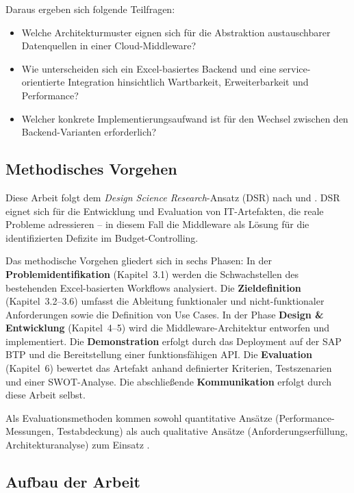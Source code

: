 Daraus ergeben sich folgende Teilfragen:

\begin{itemize}
    \item[\textbf{TF-1}] Welche Architekturmuster eignen sich für die Abstraktion austauschbarer Datenquellen in einer Cloud-Middleware?
    \item[\textbf{TF-2}] Wie unterscheiden sich ein Excel-basiertes Backend und eine service-orientierte Integration hinsichtlich Wartbarkeit, Erweiterbarkeit und Performance?
    \item[\textbf{TF-3}] Welcher konkrete Implementierungsaufwand ist für den Wechsel zwischen den Backend-Varianten erforderlich?
\end{itemize}

\subsection{Methodisches Vorgehen}

Diese Arbeit folgt dem \textit{Design Science Research}-Ansatz (DSR) nach \cite{hevner2004} und \cite{peffers2007}. DSR eignet sich für die Entwicklung und Evaluation von IT-Artefakten, die reale Probleme adressieren -- in diesem Fall die Middleware als Lösung für die identifizierten Defizite im Budget-Controlling.

Das methodische Vorgehen gliedert sich in sechs Phasen: In der \textbf{Problemidentifikation} (Kapitel~3.1) werden die Schwachstellen des bestehenden Excel-basierten Workflows analysiert. Die \textbf{Zieldefinition} (Kapitel~3.2--3.6) umfasst die Ableitung funktionaler und nicht-funktionaler Anforderungen sowie die Definition von Use Cases. In der Phase \textbf{Design \& Entwicklung} (Kapitel~4--5) wird die Middleware-Architektur entworfen und implementiert. Die \textbf{Demonstration} erfolgt durch das Deployment auf der SAP BTP und die Bereitstellung einer funktionsfähigen API. Die \textbf{Evaluation} (Kapitel~6) bewertet das Artefakt anhand definierter Kriterien, Testszenarien und einer SWOT-Analyse. Die abschließende \textbf{Kommunikation} erfolgt durch diese Arbeit selbst.

Als Evaluationsmethoden kommen sowohl quantitative Ansätze (Performance-Messungen, Testabdeckung) als auch qualitative Ansätze (Anforderungserfüllung, Architekturanalyse) zum Einsatz \citep{wohlin2012}.

\subsection{Aufbau der Arbeit}

